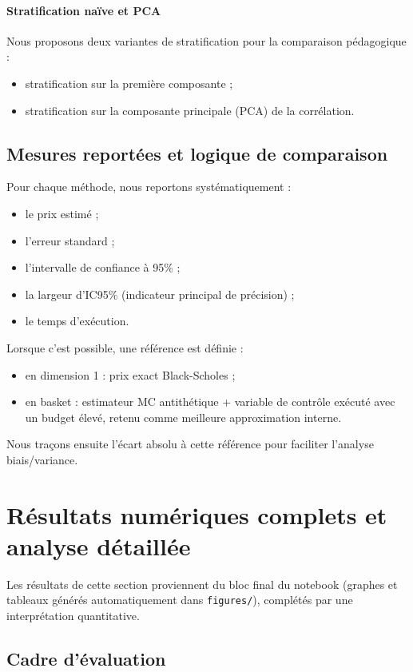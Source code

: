 ﻿\documentclass[11pt,a4paper]{article}
\begin{document}
\paragraph{Stratification naïve et PCA}
Nous proposons deux variantes de stratification pour la comparaison pédagogique :
\begin{itemize}
    \item stratification sur la première composante ;
    \item stratification sur la composante principale (PCA) de la corrélation.
\end{itemize}

\subsection{Mesures reportées et logique de comparaison}

Pour chaque méthode, nous reportons systématiquement :
\begin{itemize}
    \item le prix estimé ;
    \item l'erreur standard ;
    \item l'intervalle de confiance à 95\% ;
    \item la largeur d'IC95\% (indicateur principal de précision) ;
    \item le temps d'exécution.
\end{itemize}

Lorsque c'est possible, une référence est définie :
\begin{itemize}
    \item en dimension 1 : prix exact Black-Scholes ;
    \item en basket : estimateur MC antithétique + variable de contrôle exécuté avec un budget élevé, retenu comme meilleure approximation interne.
\end{itemize}
Nous traçons ensuite l'écart absolu à cette référence pour faciliter l'analyse biais/variance.

\section{Résultats numériques complets et analyse détaillée}

Les résultats de cette section proviennent du bloc final du notebook (graphes et tableaux générés automatiquement dans \texttt{figures/}), complétés par une interprétation quantitative.

\subsection{Cadre d'évaluation}
\end{document}
